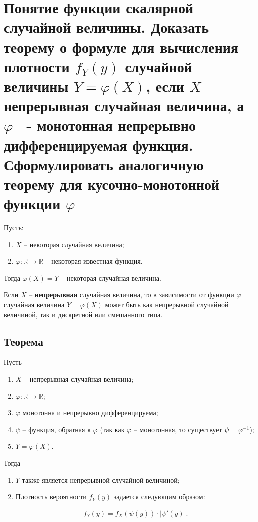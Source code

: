 \section{Понятие функции скалярной случайной величины. Доказать теорему о формуле для вычисления плотности $f_Y(y)$ случайной величины $Y=\varphi (X)$, если $X$ – непрерывная случайная величина, а $\varphi$ –- монотонная непрерывно дифференцируемая функция. Сформулировать аналогичную теорему для кусочно-монотонной функции $\varphi$}

Пусть:
\begin{enumerate}
	\item $X$ -- некоторая случайная величина;
	\item $\varphi: \mathbb{R} \rightarrow \mathbb{R}$ -- некоторая известная функция.
\end{enumerate}

Тогда $\varphi (X) = Y$ -- некоторая случайная величина.

Если $X$ -- \textbf{непрерывная} случайная величина, то в зависимости от функции $\varphi$ случайная величина $Y = \varphi(X)$ может быть как непрерывной случайной величиной, так и дискретной или смешанного типа.

\subsection*{Теорема}

Пусть
\begin{enumerate}
	\item $X$ -- непрерывная случайная величина;
	\item $\varphi: \mathbb{R} \to \mathbb{R}$;
	\item $\varphi$ монотонна и непрерывно дифференцируема;
	\item $\psi$ -- функция, обратная к $\varphi$ (так как $\varphi$ -- монотонная, то существует $\psi = \varphi^{-1}$);
	\item $Y = \varphi(X)$.
\end{enumerate}

Тогда
\begin{enumerate}
	\item $Y$ также является непрерывной случайной величиной;
	\item Плотность вероятности $f_Y(y)$ задается следующим образом: 
	
	\begin{align*}
		f_Y(y) = f_X(\psi(y)) \cdot\left|\psi'(y)\right|.
	\end{align*}
\end{enumerate}

